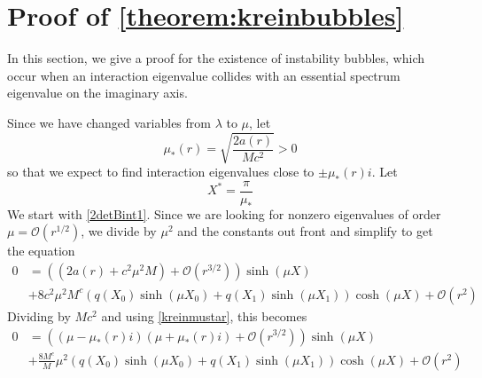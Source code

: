 \documentclass[thesis.tex]{subfiles}
\begin{document}
\section{Proof of \cref{theorem:kreinbubbles}}

In this section, we give a proof for the existence of instability bubbles, which occur when an interaction eigenvalue collides with an essential spectrum eigenvalue on the imaginary axis. 

Since we have changed variables from $\lambda$ to $\mu$, let
\begin{equation}\label{kreinmustar}
\mu_*(r) = \sqrt{\frac{2 a(r)}{M c^2}} > 0
\end{equation}
so that we expect to find interaction eigenvalues close to $\pm \mu_*(r) i$. Let
\[
X^* = \frac{\pi}{\mu_*}
\]
We start with \cref{2detBint1}. Since we are looking for nonzero eigenvalues of order $\mu = \mathcal{O}(r^{1/2})$, we divide by $\mu^2$ and the constants out front and simplify to get the equation
\begin{equation}\label{KreinB1}
\begin{aligned}
0 &= \left( (2a(r) + c^2 \mu^2 M) +  \mathcal{O}( r^{3/2} )\right) \sinh(\mu X) \\
&+ 8 c^2 \mu^2 M^c ( q(X_0) \sinh(\mu X_0) + q(X_1) \sinh(\mu X_1) ) \cosh(\mu X) + \mathcal{O}( r^2 ) 
\end{aligned}
\end{equation}
Dividing by $M c^2$ and using \cref{kreinmustar}, this becomes
\begin{equation}\label{KreinB2}
\begin{aligned}
0 &= \left( (\mu - \mu_*(r) i)( \mu + \mu_*(r) i) +  \mathcal{O}( r^{3/2} )\right) \sinh(\mu X) \\
&+\frac{8 M^c}{M} \mu^2 ( q(X_0)\sinh(\mu X_0) + q(X_1) \sinh(\mu X_1) ) \cosh(\mu X) + \mathcal{O}( r^2 ) 
\end{aligned}
\end{equation}
\end{document}
